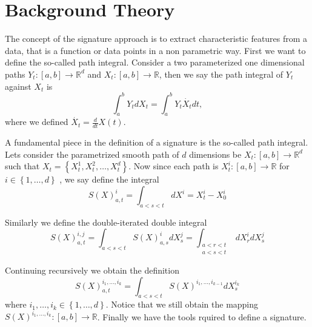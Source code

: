 

\section{Background Theory}%
\label{sec:background}


The concept of the signature approach is to extract characteristic features from a data, that is a function or data points in a non parametric way.
First we want to define the so-called path integral.
Consider a two parameterized one dimensional paths  $Y_{t}: [a,b] \to  \mathbb{R} ^{d} $ and $X_t: [a,b] \to \mathbb{R} $, then we say the path integral of $Y_{t}$ against $X_{t}$  is \begin{equation}
    \int_{a}^{b} Y_{t} dX_{t} = \int_{a}^{b}  Y_{t} \dot{X_{t}}dt,
\end{equation}  where we defined $ \dot{X_{t}} = \frac{d}{dt}X( t)   $.


A fundamental piece in the definition of a signature is
the so-called path integral.
Lets consider the parametrized smooth path of $d$ dimensions be $X_{t}: \left[ a,b \right] \to  \mathbb{R} ^{d}  $ such that $X_{t} = \left\{ X^{1}_{t},  X_{t}^{2}, \ldots, X_{t}^{d} \right\} $. Now since each path is $X^{i}_{t}: [a,b] \to
\mathbb{R} $ for $i \in \left\{ 1, \ldots, d \right\} $ , we say define the integral \begin{equation}
    S( X)_{a,t}^{i} =  \int_{a < s < t}^{} dX^{i} = X^{i}_{t} - X_{0}^{i}
\end{equation}

Similarly we define the double-iterated double integral \begin{equation*}
    S( X)^{i,j}_{a,t} = \int_{a < s<t}^{} S( X)_{a,s}^{i}dX^{j}_{s} = \int_{\substack{a < r < t \\ a < s < t}}^{} dX^{i}_{r} dX^{j}_{s}
\end{equation*}


 Continuing recursively we obtain the definition \begin{equation*}
     S( X) _{a,t}^{i_{1},\ldots, i_{k}} =  \int_{a < s <t}^{} S( X) ^{i_{1}, \ldots, i_{k-1}} dX^{i_{k}}_{s}
 \end{equation*}
 where $i_{1}, \ldots, i_{k} \in \left\{ 1, \ldots, d \right\} $. Notice that we still obtain the mapping $S( X)^{i_{1}, \ldots, i_{k}}: [a,b] \to \mathbb{R}  $.  Finally we have the tools rquired to define a signature.

